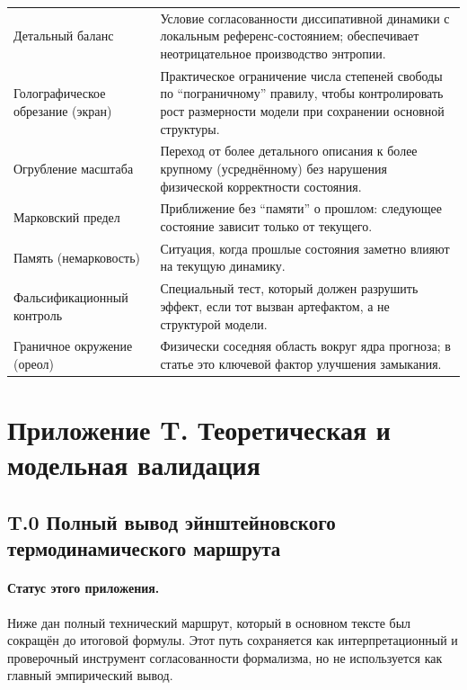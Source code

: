 \documentclass[11pt,a4paper]{article}
\theoremstyle{definition}
\theoremstyle{plain}
\theoremstyle{remark}
\begin{document}
\begin{table}[H]
\begin{tabular}{@{}p{3.6cm}p{10.4cm}@{}}
Детальный баланс & Условие согласованности диссипативной динамики с локальным референс-состоянием; обеспечивает неотрицательное производство энтропии. \\
Голографическое обрезание (экран) & Практическое ограничение числа степеней свободы по ``пограничному'' правилу, чтобы контролировать рост размерности модели при сохранении основной структуры. \\
Огрубление масштаба & Переход от более детального описания к более крупному (усреднённому) без нарушения физической корректности состояния. \\
Марковский предел & Приближение без ``памяти'' о прошлом: следующее состояние зависит только от текущего. \\
Память (немарковость) & Ситуация, когда прошлые состояния заметно влияют на текущую динамику. \\
Фальсификационный контроль & Специальный тест, который должен разрушить эффект, если тот вызван артефактом, а не структурой модели. \\
Граничное окружение (ореол) & Физически соседняя область вокруг ядра прогноза; в статье это ключевой фактор улучшения замыкания. \\
\bottomrule
\end{tabular}
\end{table}

\section*{Приложение T. Теоретическая и модельная валидация}
\label{sec:appendix:toy}

\subsection*{T.0 Полный вывод эйнштейновского термодинамического маршрута}
\label{sec:appendix:einstein_full}

\paragraph{Статус этого приложения.}
Ниже дан полный технический маршрут, который в основном тексте был сокращён до итоговой формулы.
Этот путь сохраняется как интерпретационный и проверочный инструмент согласованности формализма,
но не используется как главный эмпирический вывод.
\end{document}
